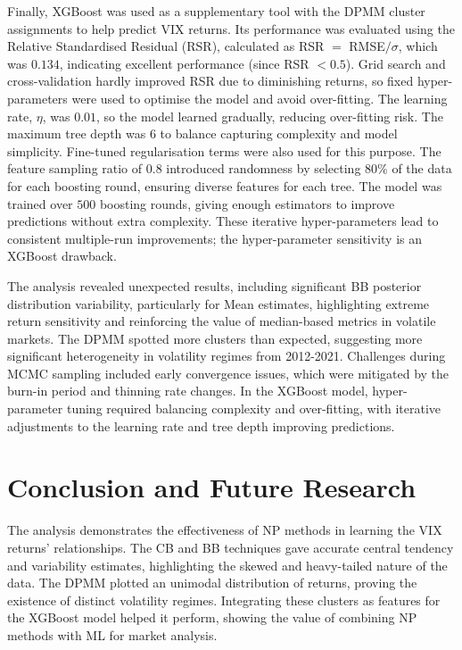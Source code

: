 \documentclass[12pt]{report} %
\begin{document}
Finally, XGBoost was used as a supplementary tool with the DPMM cluster assignments to help predict VIX returns. Its performance was evaluated using the Relative Standardised Residual (RSR), calculated as RSR $=$ RMSE$/\sigma$, which was $0.134$, indicating excellent performance (since RSR $< 0.5$). Grid search and cross-validation hardly improved RSR due to diminishing returns, so fixed hyper-parameters were used to optimise the model and avoid over-fitting. The learning rate, $\eta$, was $0.01$, so the model learned gradually, reducing over-fitting risk. The maximum tree depth was $6$ to balance capturing complexity and model simplicity. Fine-tuned regularisation terms were also used for this purpose. The feature sampling ratio of $0.8$ introduced randomness by selecting 80\% of the data for each boosting round, ensuring diverse features for each tree. The model was trained over $500$ boosting rounds, giving enough estimators to improve predictions without extra complexity. These iterative hyper-parameters lead to consistent multiple-run improvements; the hyper-parameter sensitivity is an XGBoost drawback.


The analysis revealed unexpected results, including significant BB posterior distribution variability, particularly for Mean estimates, highlighting extreme return sensitivity and reinforcing the value of median-based metrics in volatile markets. The DPMM spotted more clusters than expected, suggesting more significant heterogeneity in volatility regimes from 2012-2021. Challenges during MCMC sampling included early convergence issues, which were mitigated by the burn-in period and thinning rate changes. In the XGBoost model, hyper-parameter tuning required balancing complexity and over-fitting, with iterative adjustments to the learning rate and tree depth improving predictions.

\section{Conclusion and Future Research}
The analysis demonstrates the effectiveness of NP methods in learning the VIX returns' relationships. The CB and BB techniques gave accurate central tendency and variability estimates, highlighting the skewed and heavy-tailed nature of the data. The DPMM plotted an unimodal distribution of returns, proving the existence of distinct volatility regimes. Integrating these clusters as features for the XGBoost model helped it perform, showing the value of combining NP methods with ML for market analysis. 
\end{document}
